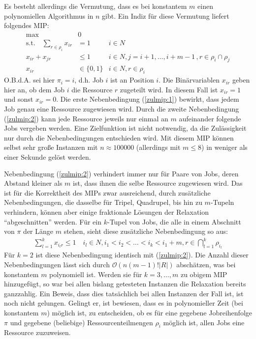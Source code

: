 \documentclass{scrreprt}
\begin{document}
Es besteht allerdings die Vermutung, dass es bei konstantem $m$ einen polynomiellen Algorithmus in $n$ gibt. Ein Indiz für diese Vermutung liefert folgendes MIP:
\begin{align}
    \text{max} \quad &0 \label{zulmip:obj} \\
    \text{s.t.}\quad \sum_{r\in\rho_i} x_{ir} &= 1 & i\in N \label{zulmip:1} \\
    x_{ir} + x_{jr} &\leq 1 & i\in N, j=i+1,\ldots,i+m-1 \, ,r\in\rho_i\cap\rho_j \label{zulmip:2} \\
    x_{ir} &\in \{0,1\} & i\in N, r\in\rho_i
\end{align}
O.B.d.A. sei hier $\pi_i=i$, d.h. Job $i$ ist an Position $i$.
Die Binärvariablen $x_{ir}$ geben hier an, ob dem Job $i$ die Ressource $r$ zugeteilt wird.
In diesem Fall ist $x_{ir}=1$ und sonst $x_{ir}=0$.
Die erste Nebenbedingung (\ref{zulmip:1}) bewirkt, dass jedem Job genau eine Ressource zugewiesen wird.
Durch die zweite Nebenbedingung (\ref{zulmip:2}) kann jede Ressource jeweils nur einmal an $m$ aufeinander folgende Jobs vergeben werden.
Eine Zielfunktion ist nicht notwendig, da die Zulässigkeit nur durch die Nebenbedingungen entschieden wird.
Mit diesem MIP können selbst sehr große Instanzen mit $n\approx 100000$ (allerdings mit $m\leq 8$) in weniger als einer Sekunde gelöst werden.

Nebenbedingung (\ref{zulmip:2}) verhindert immer nur für Paare von Jobs, deren Abstand kleiner als $m$ ist, dass ihnen die selbe Ressource zugewiesen wird.
Das ist für die Korrektheit des MIPs zwar ausreichend, durch zusätzliche Nebenbedingungen, die dasselbe für Tripel, Quadrupel, bis hin zu $m$-Tupeln verhindern,
können aber einige fraktionale Lösungen der Relaxation "`abgeschnitten"' werden.
Für ein $k$-Tupel von Jobs, die alle in einem Abschnitt von $\pi$ der Länge $m$ stehen, sieht diese zusätzliche Nebenbedingung so aus:
\begin{align}
    \sum_{l=1}^k x_{i_lr} \leq 1 \quad i_l\in N, i_1<i_2<\ldots<i_k<i_1+m, r\in\bigcap_{l=1}^k \rho_{i_l}
\end{align}
Für $k=2$ ist diese Nebenbedingung identisch mit (\ref{zulmip:2}).
Die Anzahl dieser Nebenbedingungen lässt sich durch $\mathcal{O}(n(m-1)!|R|)$ abschätzen, was bei konstantem $m$ polynomiell ist.
Werden sie für $k=3,\ldots,m$ zu obigem MIP hinzugefügt, so war bei allen bislang getesteten Instanzen die Relaxation bereits ganzzahlig.
Ein Beweis, dass dies tatsächlich bei allen Instanzen der Fall ist, ist noch nicht gelungen.
Gelingt er, ist bewiesen, dass es in polynomieller Zeit (bei konstantem $m$) möglich ist, zu entscheiden, ob es für eine gegebene Jobreihenfolge $\pi$ und 
gegebene (beliebige) Ressourcenteilmengen $\rho_i$ möglich ist, allen Jobs eine Ressource zuzuweisen.
\end{document}
